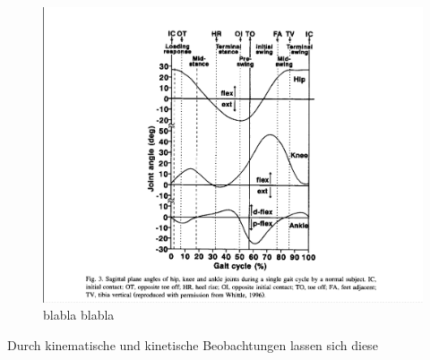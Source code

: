 \begin{figure}
	\centering
	\includegraphics[width=0.7\linewidth]{bilder/Einleitung/gangphasen}
	\caption[Gangphasen]{blabla blabla}
	\label{fig:gangphasen}
\end{figure}


 Durch kinematische und kinetische Beobachtungen lassen sich diese 